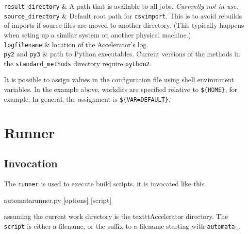 \RPtwo \texttt{result\_directory} & A path that is available to all
jobs.  \textsl{Currently not in use.}  \\[1ex]

\RPtwo \texttt{source\_directory} & Default root path for
\texttt{csvimport}.  This is to avoid rebuilds of imports if source
files are moved to another directory.  (This typically happens when
seting up a similar system on another physical machine.)\\[1ex]

\RPtwo \texttt{logfilename} & location of the Accelerator's log.\\[1ex]

\RPtwo \texttt{py2} and \texttt{py3} & path to Python executables.
Current versions of the methods in the \texttt{standard\_methods}
directory require \texttt{python2}.
\\[1ex]

\stoptabletwo

It is possible to assign values in the configuration file using shell
environment variables.  In the example above, workdirs are specified
relative to \texttt{\$\{HOME\}}, for example.  In general, the
assignment is \texttt{\$\{VAR=DEFAULT\}}.



\clearpage
\section{Runner}

\subsection{Invocation}
The \texttt{runner} is used to execute build scripts.  it is invocated
like this
\begin{shell}
automatarunner.py [options] [script]
\end{shell}
assuming the current work directory is the texttt{Accelerator}
directory.  The \texttt{script} is either a filename, or the suffix to
a filename starting with \texttt{automata\_}.

